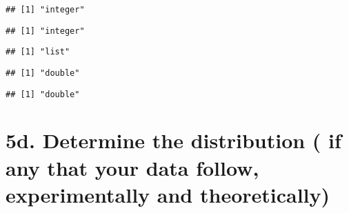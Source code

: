 \documentclass[
]{article}
\newenvironment{Shaded}{\begin{snugshade}}{\end{snugshade}}
\newcommand{\KeywordTok}[1]{\textcolor[rgb]{0.13,0.29,0.53}{\textbf{#1}}}
\newcommand{\NormalTok}[1]{#1}
\newcommand{\OperatorTok}[1]{\textcolor[rgb]{0.81,0.36,0.00}{\textbf{#1}}}
\begin{document}
\begin{verbatim}
## [1] "integer"
\end{verbatim}

\begin{Shaded}
\end{Shaded}

\begin{verbatim}
## [1] "integer"
\end{verbatim}

\begin{Shaded}
\end{Shaded}

\begin{verbatim}
## [1] "list"
\end{verbatim}

\begin{Shaded}
\end{Shaded}

\begin{verbatim}
## [1] "double"
\end{verbatim}

\begin{Shaded}
\end{Shaded}

\begin{verbatim}
## [1] "double"
\end{verbatim}

\hypertarget{d.-determine-the-distribution-if-any-that-your-data-follow-experimentally-and-theoretically}{%
\section{5d. Determine the distribution ( if any that your data follow,
experimentally and
theoretically)}\label{d.-determine-the-distribution-if-any-that-your-data-follow-experimentally-and-theoretically}}
\end{document}
